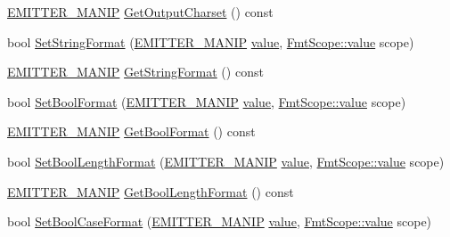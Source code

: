 \begin{DoxyCompactItemize}
\item 
\mbox{\hyperlink{namespace_y_a_m_l_a67c320aa50d3de7ecba1d0b8775dd684}{E\+M\+I\+T\+T\+E\+R\+\_\+\+M\+A\+N\+IP}} \mbox{\hyperlink{class_y_a_m_l_1_1_emitter_state_ab7027061c855ac571e0f1841c919e92b}{Get\+Output\+Charset}} () const
\item 
bool \mbox{\hyperlink{class_y_a_m_l_1_1_emitter_state_a18753ce62cfb9d900cc0bc8ea6ee0d38}{Set\+String\+Format}} (\mbox{\hyperlink{namespace_y_a_m_l_a67c320aa50d3de7ecba1d0b8775dd684}{E\+M\+I\+T\+T\+E\+R\+\_\+\+M\+A\+N\+IP}} \mbox{\hyperlink{glad_8h_a03aff08f73d7fde3d1a08e0abd8e84fa}{value}}, \mbox{\hyperlink{struct_y_a_m_l_1_1_fmt_scope_a58c967eadfafdc79f62cd5c59ec2b1fe}{Fmt\+Scope\+::value}} scope)
\item 
\mbox{\hyperlink{namespace_y_a_m_l_a67c320aa50d3de7ecba1d0b8775dd684}{E\+M\+I\+T\+T\+E\+R\+\_\+\+M\+A\+N\+IP}} \mbox{\hyperlink{class_y_a_m_l_1_1_emitter_state_a16cb8ba88559cfefdf8054c4e7d50b7b}{Get\+String\+Format}} () const
\item 
bool \mbox{\hyperlink{class_y_a_m_l_1_1_emitter_state_a4fad94ca5f872e1c051598f6740abf24}{Set\+Bool\+Format}} (\mbox{\hyperlink{namespace_y_a_m_l_a67c320aa50d3de7ecba1d0b8775dd684}{E\+M\+I\+T\+T\+E\+R\+\_\+\+M\+A\+N\+IP}} \mbox{\hyperlink{glad_8h_a03aff08f73d7fde3d1a08e0abd8e84fa}{value}}, \mbox{\hyperlink{struct_y_a_m_l_1_1_fmt_scope_a58c967eadfafdc79f62cd5c59ec2b1fe}{Fmt\+Scope\+::value}} scope)
\item 
\mbox{\hyperlink{namespace_y_a_m_l_a67c320aa50d3de7ecba1d0b8775dd684}{E\+M\+I\+T\+T\+E\+R\+\_\+\+M\+A\+N\+IP}} \mbox{\hyperlink{class_y_a_m_l_1_1_emitter_state_a66167174d10833df381eb3f0e3fab06f}{Get\+Bool\+Format}} () const
\item 
bool \mbox{\hyperlink{class_y_a_m_l_1_1_emitter_state_adcd943faa13d98eea7c9357ee219dc24}{Set\+Bool\+Length\+Format}} (\mbox{\hyperlink{namespace_y_a_m_l_a67c320aa50d3de7ecba1d0b8775dd684}{E\+M\+I\+T\+T\+E\+R\+\_\+\+M\+A\+N\+IP}} \mbox{\hyperlink{glad_8h_a03aff08f73d7fde3d1a08e0abd8e84fa}{value}}, \mbox{\hyperlink{struct_y_a_m_l_1_1_fmt_scope_a58c967eadfafdc79f62cd5c59ec2b1fe}{Fmt\+Scope\+::value}} scope)
\item 
\mbox{\hyperlink{namespace_y_a_m_l_a67c320aa50d3de7ecba1d0b8775dd684}{E\+M\+I\+T\+T\+E\+R\+\_\+\+M\+A\+N\+IP}} \mbox{\hyperlink{class_y_a_m_l_1_1_emitter_state_a341eae81d963d258ad0deb8235459774}{Get\+Bool\+Length\+Format}} () const
\item 
bool \mbox{\hyperlink{class_y_a_m_l_1_1_emitter_state_a9fa41dac72f2ea2800a621c505dafc65}{Set\+Bool\+Case\+Format}} (\mbox{\hyperlink{namespace_y_a_m_l_a67c320aa50d3de7ecba1d0b8775dd684}{E\+M\+I\+T\+T\+E\+R\+\_\+\+M\+A\+N\+IP}} \mbox{\hyperlink{glad_8h_a03aff08f73d7fde3d1a08e0abd8e84fa}{value}}, \mbox{\hyperlink{struct_y_a_m_l_1_1_fmt_scope_a58c967eadfafdc79f62cd5c59ec2b1fe}{Fmt\+Scope\+::value}} scope)

\end{DoxyCompactItemize}
